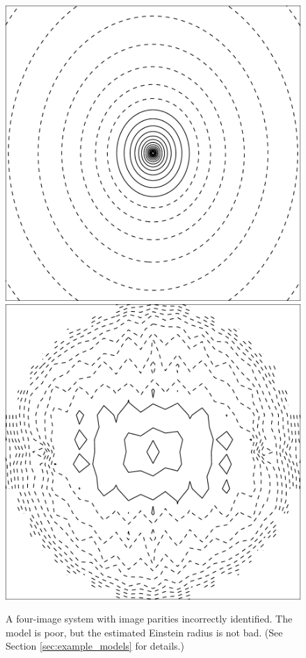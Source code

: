 \begin{figure}
  \includegraphics[width=\myplotswidth]{fig/ASW0000h2m_007025_kappa}
  \includegraphics[width=\myplotswidth]{fig/007025_mass}
  \caption[result 7025 (ASW0000h2m)]{A four-image system with image
    parities incorrectly identified.  The model is poor, but the
    estimated Einstein radius is not bad. (See Section
    \ref{sec:example_models} for details.)}
  \label{fig:7025}
\end{figure}

